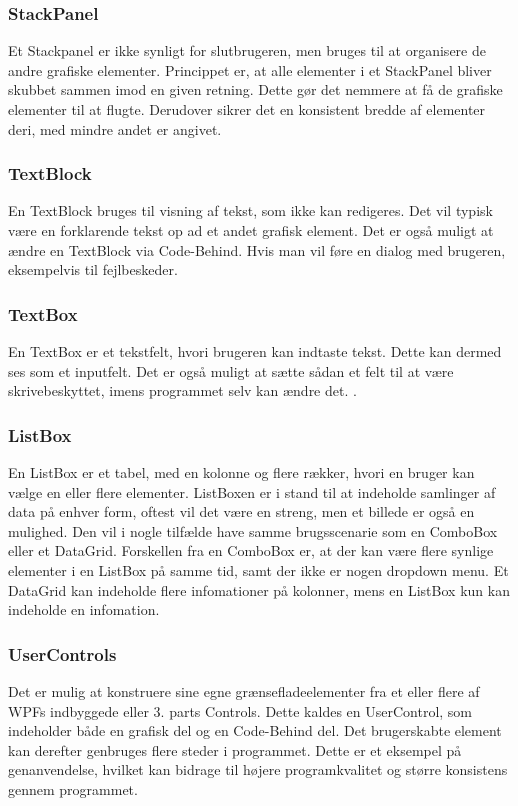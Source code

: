 \subsubsection*{StackPanel}
Et Stackpanel er ikke synligt for slutbrugeren, men bruges til at organisere de andre grafiske elementer.
Princippet er, at alle elementer i et StackPanel bliver skubbet sammen imod en given retning.
Dette gør det nemmere at få de grafiske elementer til at flugte.
Derudover sikrer det en konsistent bredde af elementer deri, med mindre andet er angivet.

\subsubsection*{TextBlock}
En TextBlock bruges til visning af tekst, som ikke kan redigeres.
Det vil typisk være en forklarende tekst op ad et andet grafisk element.
Det er også muligt at ændre en TextBlock via Code-Behind. 
Hvis man vil føre en dialog med brugeren, eksempelvis til fejlbeskeder.

\subsubsection*{TextBox}
En TextBox er et tekstfelt, hvori brugeren kan indtaste tekst. 
Dette kan dermed ses som et inputfelt. 
Det er også muligt at sætte sådan et felt til at være skrivebeskyttet, imens programmet selv kan ændre det. .

\subsubsection*{ListBox}
En ListBox er et tabel, med en kolonne og flere rækker, hvori en bruger kan vælge en eller flere elementer.
ListBoxen er i stand til at indeholde samlinger af data på enhver form, oftest vil det være en streng, men et billede er også en mulighed.
Den vil i nogle tilfælde have samme brugsscenarie som en ComboBox eller et DataGrid. 
Forskellen fra en ComboBox er, at der kan være flere synlige elementer i en ListBox på samme tid, samt der ikke er nogen dropdown menu.
Et DataGrid kan indeholde flere infomationer på kolonner, mens en ListBox kun kan indeholde en infomation.

\subsubsection*{UserControls}
Det er mulig at konstruere sine egne grænsefladeelementer fra et eller flere af WPFs indbyggede eller 3. parts Controls.
Dette kaldes en UserControl, som indeholder både en grafisk del og en Code-Behind del.
Det brugerskabte element kan derefter genbruges flere steder i programmet.
Dette er et eksempel på genanvendelse, hvilket kan bidrage til højere programkvalitet og større konsistens gennem programmet. 
